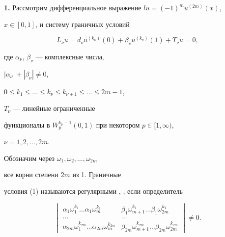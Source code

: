  


 


{\bf 1.} Рассмотрим дифференциальное выражение $lu=(-1)^mu^{(2m)}(x)$, 


$x\in[0,1]$, и систему граничных условий 


\begin{equation} 




L_\nu u=d_\nu u^{(k_\nu)}(0)+\beta_\nu u^{(k_\nu)}(1)+T_\nu u =0,


\end{equation} 


где $\alpha_\nu$, $\beta_\nu$ --- комплексные числа, 


$|\alpha_\nu|+|\beta_\nu|\ne 0$, 


$0\le k_1\le\dots\le k_\nu\le k_{\nu+1}\le\dots\le 2m-1$, 


$T_\nu$ --- линейные ограниченные 


функционалы в $W_p^{k_\nu-1}(0,1)$ при некотором $p\in[1,\infty)$, 


$\nu=1,2,\dotsc,2m$. 


 


Обозначим через $\omega_1,\omega_2,\dotsc,\omega_{2m}$ 


все корни степени $2m$ из 1. Граничные 


условия (1) называются регулярными \cite{Yak}, \cite{Nai}, если определитель 


\begin{equation} 


\begin{vmatrix} 


\alpha_1\omega_1^{k_1}\dots \alpha_1\omega_m^{k_1} & 


\beta_1\omega_{m+1}^{k_1}\dots \beta_1\omega_{2m}^{k_1}\\ 


\dots & \dots \\




\alpha_{2m}\omega_1^{k_{2m}}\dots \alpha_{2m}\omega_m^{k_{2m}}& 


\beta_{2m}\omega_{m+1}^{k_{2m}}\dots \beta_{2m}\omega_{2m}^{k_{2m}} 


\end{vmatrix} 


\ne 0. 


\end{equation} 


